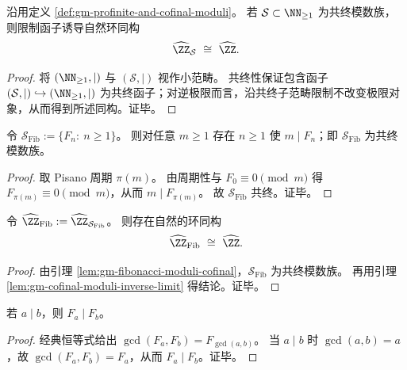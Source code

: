 \begin{lemma}\label{lem:gm-cofinal-moduli-inverse-limit}
沿用定义 \ref{def:gm-profinite-and-cofinal-moduli}。
若 \(\mathcal{S}\subset\NN_{\ge 1}\) 为共终模数族，则限制函子诱导自然环同构
\[
\widehat{\ZZ}_{\mathcal{S}}\ \cong\ \widehat{\ZZ}.
\]
\end{lemma}
\begin{proof}
将 \((\NN_{\ge 1},\mid)\) 与 \((\mathcal{S},\mid)\) 视作小范畴。
共终性保证包含函子 \((\mathcal{S},\mid)\hookrightarrow(\NN_{\ge 1},\mid)\) 为共终函子；对逆极限而言，沿共终子范畴限制不改变极限对象，从而得到所述同构。证毕。
\end{proof}

\begin{lemma}[Pisano 周期 \texorpdfstring{$\Rightarrow$}{=>} Fibonacci 模数的共终性]\label{lem:gm-fibonacci-moduli-cofinal}
令 \(\mathcal{S}_{\mathrm{Fib}}:=\{F_n:\ n\ge 1\}\)。
则对任意 \(m\ge 1\) 存在 \(n\ge 1\) 使 \(m\mid F_n\)；即 \(\mathcal{S}_{\mathrm{Fib}}\) 为共终模数族。
\end{lemma}
\begin{proof}
取 Pisano 周期 \(\pi(m)\)。
由周期性与 \(F_0\equiv 0\pmod m\) 得 \(F_{\pi(m)}\equiv 0\pmod m\)，从而 \(m\mid F_{\pi(m)}\)。
故 \(\mathcal{S}_{\mathrm{Fib}}\) 共终。证毕。
\end{proof}

\begin{theorem}\label{thm:gm-fibonacci-profinite-axis}
令 \(\widehat{\ZZ}_{\mathrm{Fib}}:=\widehat{\ZZ}_{\mathcal{S}_{\mathrm{Fib}}}\)。
则存在自然的环同构
\[
\widehat{\ZZ}_{\mathrm{Fib}}\ \cong\ \widehat{\ZZ}.
\]
\end{theorem}
\begin{proof}
由引理 \ref{lem:gm-fibonacci-moduli-cofinal}，\(\mathcal{S}_{\mathrm{Fib}}\) 为共终模数族。
再用引理 \ref{lem:gm-cofinal-moduli-inverse-limit} 得结论。证毕。
\end{proof}

\begin{lemma}\label{lem:gm-fibonacci-divisibility}
若 \(a\mid b\)，则 \(F_a\mid F_b\)。
\end{lemma}
\begin{proof}
经典恒等式给出
\(
\gcd(F_a,F_b)=F_{\gcd(a,b)}
\)。
当 \(a\mid b\) 时 \(\gcd(a,b)=a\)，故 \(\gcd(F_a,F_b)=F_a\)，从而 \(F_a\mid F_b\)。证毕。
\end{proof}

